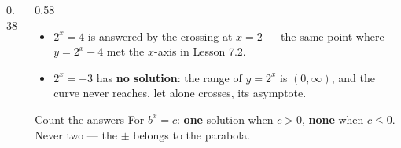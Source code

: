 \documentclass[aspectratio=169, 11pt]{beamer}
\newcommand{\lgrid}[4]{%
  \draw[step=1, linegray!45, thin] (#1,#3) grid (#2,#4);
  \draw[->, thick, charcoal] (#1,0)--(#2,0) node[below right, font=\tiny]{$x$};
  \draw[->, thick, charcoal] (0,#3)--(0,#4) node[left, font=\tiny]{$y$};}
\newcommand{\expgraph}[6]{\draw[very thick, forest, domain=#5:#6, samples=140, smooth]
  plot (\x,{(#1)*exp((#2)*((\x)-(#3)))+(#4)});}
\newcommand{\solline}[3]{\draw[goldacc, very thick] (#1,#3)--(#2,#3);}
\begin{document}
\begin{frame}[t, plain]
  \begin{columns}[T]
    \begin{column}{0.38\textwidth}
      \centering
    \end{column}
    \begin{column}{0.58\textwidth}
      \footnotesize
      \begin{itemize}\setlength{\itemsep}{4pt}
        \item $2^{x}=4$ \; is answered by the crossing at $x=2$ --- the same point where $y=2^{x}-4$
              met the $x$-axis in Lesson 7.2.
        \item $2^{x}=-3$ \; has \textbf{no solution}: the range of $y=2^{x}$ is $(0,\infty)$, and the
              curve never reaches, let alone crosses, its asymptote.
      \end{itemize}
      \vspace{3pt}
      \begin{block}{Count the answers}
        For $b^{x}=c$: \textbf{one} solution when $c>0$, \textbf{none} when $c\le0$. Never two --- the
        $\pm$ belongs to the parabola.
      \end{block}
    \end{column}
  \end{columns}
\end{frame}
\end{document}
